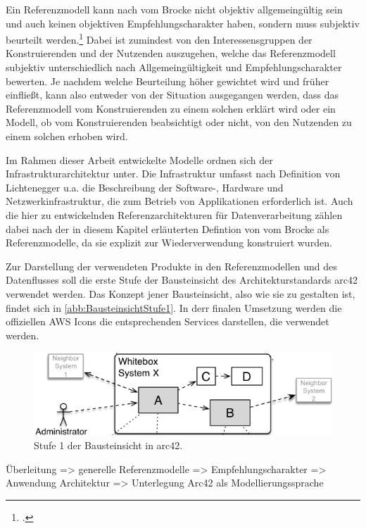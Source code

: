 Ein Referenzmodell kann nach vom Brocke nicht objektiv allgemeingültig sein und auch keinen objektiven Empfehlungscharakter haben, sondern muss subjektiv beurteilt werden.\footcite[Vgl. auch im Folgenden][31~f.]{vomBrocke.2003}  Dabei ist zumindest von den Interessensgruppen der Konstruierenden und der Nutzenden auszugehen, welche das Referenzmodell subjektiv unterschiedlich nach Allgemeingültigkeit und Empfehlungscharakter bewerten. Je nachdem welche Beurteilung höher gewichtet wird und früher einfließt, kann also entweder von der Situation ausgegangen werden, dass das Referenzmodell vom Konstruierenden zu einem solchen erklärt wird oder ein Modell, ob vom Konstruierenden beabsichtigt oder nicht, von den Nutzenden zu einem solchen erhoben wird.


Im Rahmen dieser Arbeit entwickelte Modelle ordnen sich der Infrastrukturarchitektur unter. Die Infrastruktur umfasst nach Definition von Lichtenegger u.a. die Beschreibung der Software-, Hardware und Netzwerkinfrastruktur, die zum Betrieb von Applikationen erforderlich ist.  Auch die hier zu entwickelnden Referenzarchitekturen für Datenverarbeitung zählen dabei nach der in diesem Kapitel erläuterten Defintion von vom Brocke als Referenzmodelle, da sie explizit zur Wiederverwendung konstruiert wurden.

Zur Darstellung der verwendeten Produkte in den Referenzmodellen und des Datenflusses soll die erste Stufe der Bausteinsicht des Architekturstandards arc42 verwendet werden. Das Konzept jener Bausteinsicht, also wie sie zu gestalten ist, findet sich in \autoref{abb:BausteinsichtStufe1}. In derr finalen Umsetzung werden die offiziellen \ac{AWS} Icons die entsprechenden Services darstellen, die verwendet werden.

\begin{figure}[H]
\centering
\includegraphics[width=\textwidth]{graphics/erste-Stufe-Bausteinsicht.png}
\caption[Stufe 1 der Bausteinsicht in arc42]{Stufe 1 der Bausteinsicht in arc42.\footnotemark}
\label{abb:BausteinsichtStufe1}
\end{figure}



Überleitung => generelle Referenzmodelle 
=> Empfehlungscharakter 
=> Anwendung Architektur 
=> Unterlegung Arc42 als Modellierungssprache

